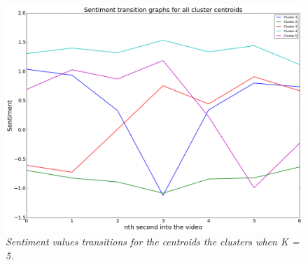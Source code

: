 \begin{figure}
\centering
\includegraphics[width=\columnwidth]{plots/5_clusters_transitions}
\caption{\textsl{Sentiment values transitions for the centroids the clusters when K = 5.}}
\label{fig:5_clusters}
\end{figure}